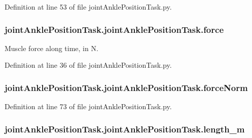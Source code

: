Definition at line 53 of file joint\+Ankle\+Position\+Task.\+py.

\subsubsection[{\texorpdfstring{force}{force}}]{\setlength{\rightskip}{0pt plus 5cm}joint\+Ankle\+Position\+Task.\+joint\+Ankle\+Position\+Task.\+force}\hypertarget{classjoint_ankle_position_task_1_1joint_ankle_position_task_a4eebc760c7522dcea949a1284e9f5d2a}{}\label{classjoint_ankle_position_task_1_1joint_ankle_position_task_a4eebc760c7522dcea949a1284e9f5d2a}


Muscle force along time, in N. 



Definition at line 36 of file joint\+Ankle\+Position\+Task.\+py.

\subsubsection[{\texorpdfstring{force\+Norm}{forceNorm}}]{\setlength{\rightskip}{0pt plus 5cm}joint\+Ankle\+Position\+Task.\+joint\+Ankle\+Position\+Task.\+force\+Norm}\hypertarget{classjoint_ankle_position_task_1_1joint_ankle_position_task_a9eb6b7c35dfac468f1f9ca3f6efb30c4}{}\label{classjoint_ankle_position_task_1_1joint_ankle_position_task_a9eb6b7c35dfac468f1f9ca3f6efb30c4}


Definition at line 73 of file joint\+Ankle\+Position\+Task.\+py.

\subsubsection[{\texorpdfstring{length\+\_\+m}{length_m}}]{\setlength{\rightskip}{0pt plus 5cm}joint\+Ankle\+Position\+Task.\+joint\+Ankle\+Position\+Task.\+length\+\_\+m}\hypertarget{classjoint_ankle_position_task_1_1joint_ankle_position_task_a90fb375d6639e59a126dd93c95782f0e}{}\label{classjoint_ankle_position_task_1_1joint_ankle_position_task_a90fb375d6639e59a126dd93c95782f0e}


